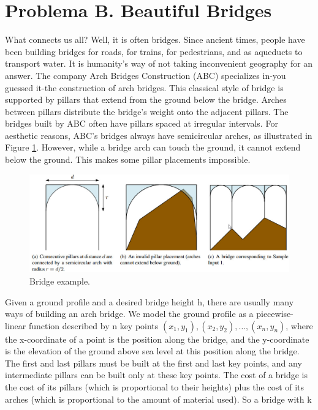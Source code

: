 \documentclass{report}
\begin{document}
\section{Problema B. Beautiful Bridges}
What connects us all? Well, it is often bridges. Since ancient times, people have been building bridges for roads, for
trains, for pedestrians, and as aqueducts to transport water. It
is humanity's way of not taking inconvenient geography for an
answer.
The company Arch Bridges Construction (ABC) specializes
in-you guessed it-the construction of arch bridges. This
classical style of bridge is supported by pillars that extend
from the ground below the bridge. Arches between pillars distribute the bridge's weight onto the adjacent pillars.
The bridges built by ABC often have pillars spaced at irregular intervals. For aesthetic reasons, ABC's
bridges always have semicircular arches, as illustrated in Figure \ref{Bridge}. However, while a bridge arch can
touch the ground, it cannot extend below the ground. This makes some pillar placements impossible.\\
\begin{figure}[h]
	\begin{center}\includegraphics[scale=0.45]{Bridge}\end{center}
	\caption{Bridge example.}	
	\label{Bridge}
\end{figure}
Given a ground profile and a desired bridge height h, there are usually many ways of building an
arch bridge. We model the ground profile as a piecewise-linear function described by n key points
$(x_1,y_1), (x_2,y_2),\ldots, (x_n,y_n)$, where the x-coordinate of a point is the position along the bridge, and
the y-coordinate is the elevation of the ground above sea level at this position along the bridge. The first
and last pillars must be built at the first and last key points, and any intermediate pillars can be built only
at these key points. The cost of a bridge is the cost of its pillars (which is proportional to their heights)
plus the cost of its arches (which is proportional to the amount of material used). So a bridge with k
\end{document}
